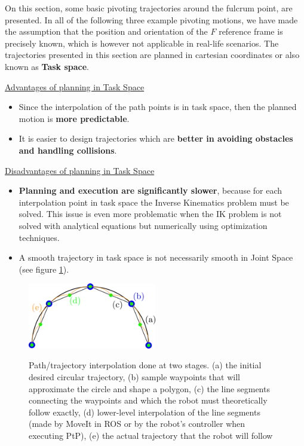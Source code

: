 On this section, some basic pivoting trajectories around the fulcrum point, are presented. In all of the following three example pivoting motions, we have made 
the assumption that the position and orientation of the ${F}$ reference frame is precisely known, which is however not applicable in real-life scenarios. The trajectories 
presented in this section are planned in cartesian coordinates or also known as \textbf{Task space}.

\underline{Advantages of planning in Task Space}
\begin{itemize}
\item Since the interpolation of the path points is in task space, then the planned motion is \textbf{more predictable}.
\item It is easier to design trajectories which are \textbf{better in avoiding obstacles and handling collisions}.
\end{itemize}

\underline{Disadvantages of planning in Task Space}
\begin{itemize}
\item \textbf{Planning and execution are significantly slower}, because for each interpolation point in task space the Inverse Kinematics problem must be solved. This issue is
even more problematic when the IK problem is not solved with analytical equations but numerically using optimization techniques.
\item A smooth trajectory in task space is not necessarily smooth in Joint Space (see figure \ref{interpolation-accuracy}).
\end{itemize}

\begin{center}
\begin{figure}[!htb]
\centering
\includegraphics[width=0.5\textwidth]{images/interpolation-accuracy.png}\\
\caption{Path/trajectory interpolation done at two stages. (a) the initial desired circular trajectory, (b) sample waypoints that will approximate the circle and shape a polygon, (c) the line segments connecting the 
waypoints and which the robot must theoretically follow exactly, (d) lower-level interpolation of the line segments (made by MoveIt in ROS or by the robot's controller when executing PtP), (e) the actual trajectory that 
the robot will follow}
\label{interpolation-accuracy}
\end{figure}
\end{center}



